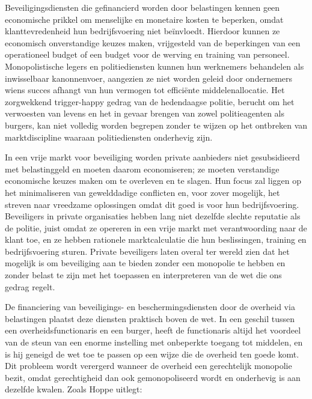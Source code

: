 \documentclass[
  a5paper,
  smalldemyvopaper,11pt,twoside,onecolumn,openright,extrafontsizes,
hidelinks]{memoir}
\begin{document}
Beveiligingsdiensten die gefinancierd worden door belastingen kennen
geen economische prikkel om menselijke en monetaire kosten te beperken,
omdat klanttevredenheid hun bedrijfsvoering niet beïnvloedt. Hierdoor
kunnen ze economisch onverstandige keuzes maken, vrijgesteld van de
beperkingen van een operationeel budget of een budget voor de werving en
training van personeel. Monopolistische legers en politiediensten kunnen
hun werknemers behandelen als inwisselbaar kanonnenvoer, aangezien ze
niet worden geleid door ondernemers wiens succes afhangt van hun
vermogen tot efficiënte middelenallocatie. Het zorgwekkend trigger-happy
gedrag van de hedendaagse politie, berucht om het verwoesten van levens
en het in gevaar brengen van zowel politieagenten als burgers, kan niet
volledig worden begrepen zonder te wijzen op het ontbreken van
marktdiscipline waaraan politiediensten onderhevig zijn.

In een vrije markt voor beveiliging worden private aanbieders niet
gesubsidieerd met belastinggeld en moeten daarom economiseren; ze moeten
verstandige economische keuzes maken om te overleven en te slagen. Hun
focus zal liggen op het minimaliseren van gewelddadige conflicten en,
voor zover mogelijk, het streven naar vreedzame oplossingen omdat dit
goed is voor hun bedrijfsvoering. Beveiligers in private organisaties
hebben lang niet dezelfde slechte reputatie als de politie, juist omdat
ze opereren in een vrije markt met verantwoording naar de klant toe, en
ze hebben rationele marktcalculatie die hun beslissingen, training en
bedrijfsvoering sturen. Private beveiligers laten overal ter wereld zien
dat het mogelijk is om beveiliging aan te bieden zonder een monopolie te
hebben en zonder belast te zijn met het toepassen en interpreteren van
de wet die ons gedrag regelt.

De financiering van beveiligings- en beschermingsdiensten door de
overheid via belastingen plaatst deze diensten praktisch boven de wet.
In een geschil tussen een overheidsfunctionaris en een burger, heeft de
functionaris altijd het voordeel van de steun van een enorme instelling
met onbeperkte toegang tot middelen, en is hij geneigd de wet toe te
passen op een wijze die de overheid ten goede komt. Dit probleem wordt
verergerd wanneer de overheid een gerechtelijk monopolie bezit, omdat
gerechtigheid dan ook gemonopoliseerd wordt en onderhevig is aan
dezelfde kwalen. Zoals Hoppe uitlegt:
\end{document}

